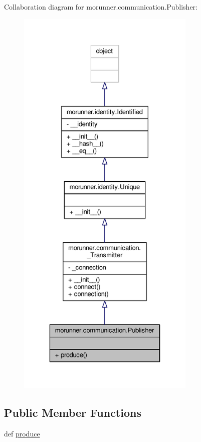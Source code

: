 Collaboration diagram for morunner.\+communication.\+Publisher\+:
\nopagebreak
\begin{figure}[H]
\begin{center}
\leavevmode
\includegraphics[height=550pt]{classmorunner_1_1communication_1_1Publisher__coll__graph}
\end{center}
\end{figure}
\subsection*{Public Member Functions}
\begin{DoxyCompactItemize}
\item 
def \hyperlink{classmorunner_1_1communication_1_1Publisher_a31e6bd7d0f60bfde37c026ddd55ff8b6}{produce}
\end{DoxyCompactItemize}


